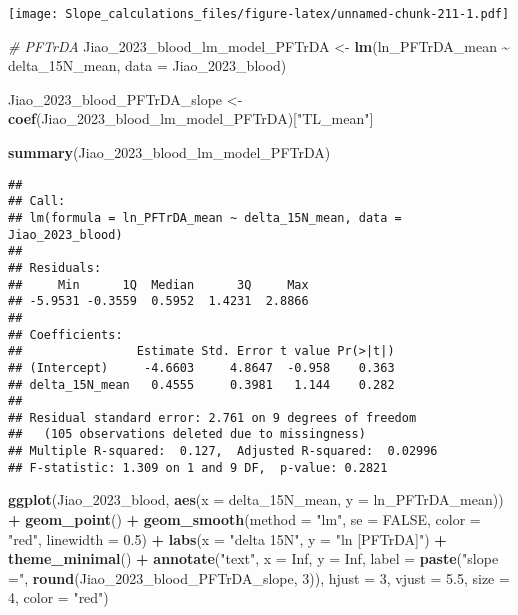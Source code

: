 \documentclass[
]{article}
\newenvironment{Shaded}{\begin{snugshade}}{\end{snugshade}}
\newcommand{\AttributeTok}[1]{\textcolor[rgb]{0.13,0.29,0.53}{#1}}
\newcommand{\CommentTok}[1]{\textcolor[rgb]{0.56,0.35,0.01}{\textit{#1}}}
\newcommand{\ConstantTok}[1]{\textcolor[rgb]{0.56,0.35,0.01}{#1}}
\newcommand{\DecValTok}[1]{\textcolor[rgb]{0.00,0.00,0.81}{#1}}
\newcommand{\FloatTok}[1]{\textcolor[rgb]{0.00,0.00,0.81}{#1}}
\newcommand{\FunctionTok}[1]{\textcolor[rgb]{0.13,0.29,0.53}{\textbf{#1}}}
\newcommand{\NormalTok}[1]{#1}
\newcommand{\OtherTok}[1]{\textcolor[rgb]{0.56,0.35,0.01}{#1}}
\newcommand{\SpecialCharTok}[1]{\textcolor[rgb]{0.81,0.36,0.00}{\textbf{#1}}}
\newcommand{\StringTok}[1]{\textcolor[rgb]{0.31,0.60,0.02}{#1}}
\begin{document}
\texttt{[image: Slope\_calculations\_files/figure-latex/unnamed-chunk-211-1.pdf]}

\begin{Shaded}
\begin{Highlighting}[]
\CommentTok{\# PFTrDA}
\NormalTok{Jiao\_2023\_blood\_lm\_model\_PFTrDA }\OtherTok{\textless{}{-}} \FunctionTok{lm}\NormalTok{(ln\_PFTrDA\_mean }\SpecialCharTok{\textasciitilde{}}\NormalTok{ delta\_15N\_mean,}
                                    \AttributeTok{data =}\NormalTok{ Jiao\_2023\_blood)}

\NormalTok{Jiao\_2023\_blood\_PFTrDA\_slope }\OtherTok{\textless{}{-}} \FunctionTok{coef}\NormalTok{(Jiao\_2023\_blood\_lm\_model\_PFTrDA)[}\StringTok{"TL\_mean"}\NormalTok{]}

\FunctionTok{summary}\NormalTok{(Jiao\_2023\_blood\_lm\_model\_PFTrDA)}
\end{Highlighting}
\end{Shaded}

\begin{verbatim}
## 
## Call:
## lm(formula = ln_PFTrDA_mean ~ delta_15N_mean, data = Jiao_2023_blood)
## 
## Residuals:
##     Min      1Q  Median      3Q     Max 
## -5.9531 -0.3559  0.5952  1.4231  2.8866 
## 
## Coefficients:
##                Estimate Std. Error t value Pr(>|t|)
## (Intercept)     -4.6603     4.8647  -0.958    0.363
## delta_15N_mean   0.4555     0.3981   1.144    0.282
## 
## Residual standard error: 2.761 on 9 degrees of freedom
##   (105 observations deleted due to missingness)
## Multiple R-squared:  0.127,  Adjusted R-squared:  0.02996 
## F-statistic: 1.309 on 1 and 9 DF,  p-value: 0.2821
\end{verbatim}

\begin{Shaded}
\begin{Highlighting}[]
\FunctionTok{ggplot}\NormalTok{(Jiao\_2023\_blood, }\FunctionTok{aes}\NormalTok{(}\AttributeTok{x =}\NormalTok{ delta\_15N\_mean, }\AttributeTok{y =}\NormalTok{ ln\_PFTrDA\_mean)) }\SpecialCharTok{+}
  \FunctionTok{geom\_point}\NormalTok{() }\SpecialCharTok{+}
  \FunctionTok{geom\_smooth}\NormalTok{(}\AttributeTok{method =} \StringTok{"lm"}\NormalTok{, }\AttributeTok{se =} \ConstantTok{FALSE}\NormalTok{, }\AttributeTok{color =} \StringTok{"red"}\NormalTok{, }\AttributeTok{linewidth =} \FloatTok{0.5}\NormalTok{) }\SpecialCharTok{+}
  \FunctionTok{labs}\NormalTok{(}\AttributeTok{x =} \StringTok{"delta 15N"}\NormalTok{,}
       \AttributeTok{y =} \StringTok{"ln [PFTrDA]"}\NormalTok{) }\SpecialCharTok{+}
  \FunctionTok{theme\_minimal}\NormalTok{() }\SpecialCharTok{+}
  \FunctionTok{annotate}\NormalTok{(}\StringTok{"text"}\NormalTok{, }\AttributeTok{x =} \ConstantTok{Inf}\NormalTok{, }\AttributeTok{y =} \ConstantTok{Inf}\NormalTok{, }\AttributeTok{label =} \FunctionTok{paste}\NormalTok{(}\StringTok{"slope ="}\NormalTok{, }\FunctionTok{round}\NormalTok{(Jiao\_2023\_blood\_PFTrDA\_slope, }\DecValTok{3}\NormalTok{)), }
           \AttributeTok{hjust =} \DecValTok{3}\NormalTok{, }\AttributeTok{vjust =} \FloatTok{5.5}\NormalTok{, }\AttributeTok{size =} \DecValTok{4}\NormalTok{, }\AttributeTok{color =} \StringTok{"red"}\NormalTok{)}
\end{Highlighting}
\end{Shaded}
\end{document}
